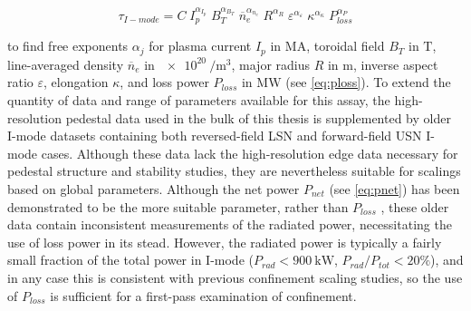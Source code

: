 \begin{equation}\label{eq:taufit}
 \tau_{I-mode} = C \; I_p^{\alpha_{I_p}} \; B_T^{\alpha_{B_T}} \; \overline{n}_e^{\alpha_{n_e}} \; R^{\alpha_R} \; \varepsilon^{\alpha_\varepsilon} \; \kappa^{\alpha_\kappa} \; P_{loss}^{\alpha_P}
\end{equation}

\noindent to find free exponents $\alpha_j$ for plasma current $I_p$ in $\si{\mega\ampere}$, toroidal field $B_T$ in $\si{\tesla}$, line-averaged density $\overline{n}_e$ in $\SI{e20}{\per\meter\cubed}$, major radius $R$ in $\si{\meter}$, inverse aspect ratio $\varepsilon$, elongation $\kappa$, and loss power $P_{loss}$ in $\si{\mega\watt}$ (see \cref{eq:ploss}).  To extend the quantity of data and range of parameters available for this assay, the high-resolution pedestal data used in the bulk of this thesis is supplemented by older I-mode datasets containing both reversed-field LSN and forward-field USN I-mode cases.  Although these data lack the high-resolution edge data necessary for pedestal structure and stability studies, they are nevertheless suitable for scalings based on global parameters.  Although the net power $P_{net}$ (see \cref{eq:pnet}) has been demonstrated to be the more suitable parameter, rather than $P_{loss}$ \cite{Hughes2002}, these older data contain inconsistent measurements of the radiated power, necessitating the use of loss power in its stead.  However, the radiated power is typically a fairly small fraction of the total power in I-mode ($P_{rad} < \SI{900}{\kilo\watt}$, $P_{rad}/P_{tot} < 20\%$), and in any case this is consistent with previous confinement scaling studies, so the use of $P_{loss}$ is sufficient for a first-pass examination of confinement.

